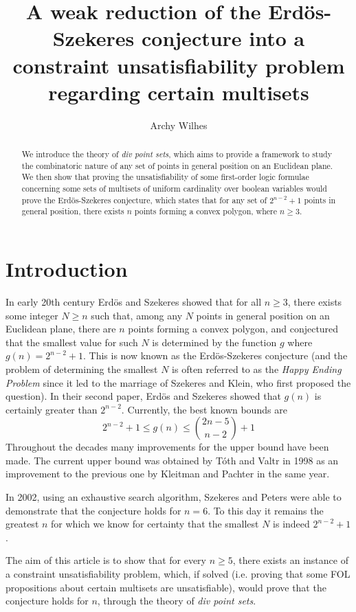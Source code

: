 \documentclass[11pt, oneside]{article}      %
\title{A weak reduction of the Erd{\"o}s-Szekeres conjecture into a constraint unsatisfiability problem regarding certain multisets}
\author{\color{black} Archy Wilhes}
\theoremstyle{definition}
\numberwithin{equation}{section}
\theoremstyle{c}
\begin{document}
\maketitle
\begin{abstract}
We introduce the theory of \textit{div point sets}, which aims to provide a framework to study the combinatoric nature of any set of points in general position on an Euclidean plane. We then show that proving the unsatisfiability of some first-order logic formulae concerning some sets of multisets of uniform cardinality over boolean variables would prove the Erd{\"o}s-Szekeres conjecture, which states that for any set of $2^{n-2}+1$ points in general position, there exists $n$ points forming a convex polygon, where $n \geq 3$.
\end{abstract}

\section{Introduction}
In early 20th century Erd{\"o}s and Szekeres \cite{erdos1935} showed that for all $n \geq 3$, there exists some integer $N \geq n$ such that, among any $N$ points in general position on an Euclidean plane, there are $n$ points forming a convex polygon, and conjectured that the smallest value for such $N$ is determined by the function $g$ where $g(n)=2^{n-2}+1$. This is now known as the Erd{\"o}s-Szekeres conjecture (and the problem of determining the smallest $N$ is often referred to as the \textit{Happy Ending Problem} since it led to the marriage of Szekeres and Klein, who first proposed the question). In their second paper, Erd{\"o}s and Szekeres \cite{erdos1960} showed that $g(n)$ is certainly greater than $2^{n-2}$. Currently, the best known bounds are
$$2^{n-2}+1 \leq g(n) \leq {2n-5 \choose n-2} +1$$
Throughout the decades many improvements for the upper bound have been made. The current upper bound was obtained by T{\'o}th and Valtr \cite{toth1998} in 1998 as an improvement to the previous one by Kleitman and Pachter \cite{kleitman1998} in the same year.

In 2002, using an exhaustive search algorithm, Szekeres and Peters \cite{szekeres2006} were able to demonstrate that the conjecture holds for $n=6$. To this day it remains the greatest $n$ for which we know for certainty that the smallest $N$ is indeed $2^{n-2}+1$.

The aim of this article is to show that for every $n \geq 5$, there exists an instance of a constraint unsatisfiability problem, which, if solved (i.e. proving that some FOL propositions about certain multisets are unsatisfiable), would prove that the conjecture holds for $n$, through the theory of \textit{div point sets}.
\end{document}
